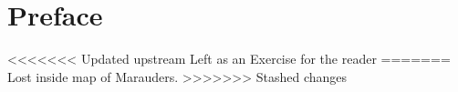 \documentclass[../Main.tex]{subfiles}
\begin{document}
\chapter*{Preface}
<<<<<<< Updated upstream
Left as an Exercise for the reader
=======
Lost inside map of Marauders.
>>>>>>> Stashed changes
\end{document}
